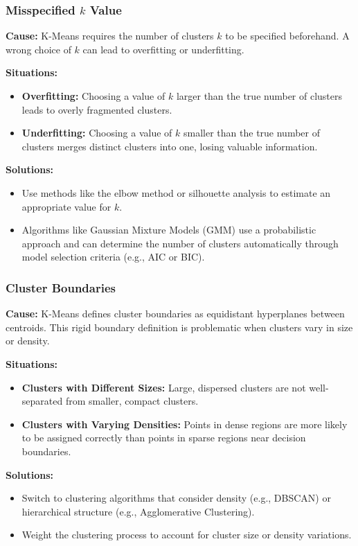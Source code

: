 \documentclass[12pt,a4paper]{article}
\begin{document}
\subsubsection{Misspecified \(k\) Value}
\textbf{Cause:}
K-Means requires the number of clusters \(k\) to be specified beforehand. A wrong choice of \(k\) can lead to overfitting or underfitting.

\textbf{Situations:}
\begin{itemize}
    \item \textbf{Overfitting:} Choosing a value of \(k\) larger than the true number of clusters leads to overly fragmented clusters.
    \item \textbf{Underfitting:} Choosing a value of \(k\) smaller than the true number of clusters merges distinct clusters into one, losing valuable information.
\end{itemize}

\textbf{Solutions:}
\begin{itemize}
    \item Use methods like the elbow method or silhouette analysis to estimate an appropriate value for \(k\).
    \item Algorithms like Gaussian Mixture Models (GMM) use a probabilistic approach and can determine the number of clusters automatically through model selection criteria (e.g., AIC or BIC).
\end{itemize}

\subsubsection{Cluster Boundaries}
\textbf{Cause:}
K-Means defines cluster boundaries as equidistant hyperplanes between centroids. This rigid boundary definition is problematic when clusters vary in size or density.

\textbf{Situations:}
\begin{itemize}
    \item \textbf{Clusters with Different Sizes:} Large, dispersed clusters are not well-separated from smaller, compact clusters.
    \item \textbf{Clusters with Varying Densities:} Points in dense regions are more likely to be assigned correctly than points in sparse regions near decision boundaries.
\end{itemize}

\textbf{Solutions:}
\begin{itemize}
    \item Switch to clustering algorithms that consider density (e.g., DBSCAN) or hierarchical structure (e.g., Agglomerative Clustering).
    \item Weight the clustering process to account for cluster size or density variations.
\end{itemize}
\end{document}
